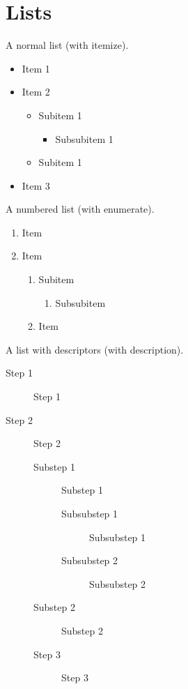 \section{Lists}
A normal list (with itemize).
\begin{itemize}
    \item Item 1
    \item Item 2
    \begin{itemize}
        \item Subitem 1
        \begin{itemize}
            \item Subsubitem 1
        \end{itemize}
        \item Subitem 1
    \end{itemize}
    \item Item 3
\end{itemize}

A numbered list (with enumerate).
\begin{enumerate}
    \item Item
    \item Item
    \begin{enumerate}
        \item Subitem
        \begin{enumerate}
            \item Subsubitem
        \end{enumerate}
        \item Item
    \end{enumerate}
\end{enumerate}

A list with descriptors (with description).
\begin{description}
    \item[Step 1] Step 1 
    \item[Step 2] Step 2 
    \begin{description}
        \item[Substep 1] Substep 1 
            \begin{description}
                \item[Subsubstep 1] Subsubstep 1 
                \item[Subsubstep 2] Subsubstep 2 
            \end{description}
            \item[Substep 2] Substep 2 
    \item[Step 3] Step 3 
    \end{description}
\end{description}

